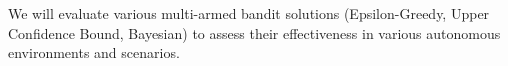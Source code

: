







 




 




We will evaluate various multi-armed bandit solutions (\eg Epsilon-Greedy, Upper Confidence Bound, Bayesian) to assess their effectiveness in various autonomous environments and scenarios.